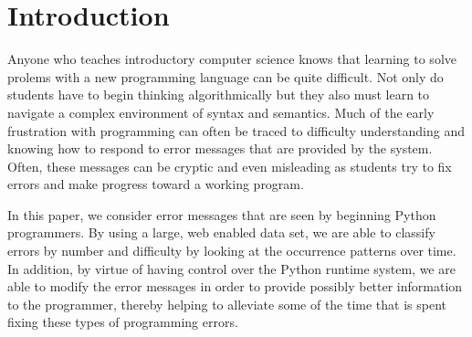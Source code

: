 \section*{Introduction}

Anyone who teaches introductory computer science knows that learning to solve prolems with a new programming language can be quite difficult.  Not only do students have to begin thinking algorithmically but they also must learn to navigate a complex environment of syntax and semantics.  Much of the early frustration with programming can often be traced to difficulty understanding and knowing how to respond to error messages that are provided by the system.  Often, these messages can be cryptic and even misleading as students try to fix errors and make progress toward a working program.

In this paper, we consider error messages that are seen by beginning Python programmers.  By using a large, web enabled data set, we are able to classify errors by number and difficulty by looking at the occurrence patterns over time.  In addition, by virtue of having control over the Python runtime system, we are able to modify the error messages in order to provide possibly better information to the programmer, thereby helping to alleviate some of the time that is spent fixing these types of programming errors.

